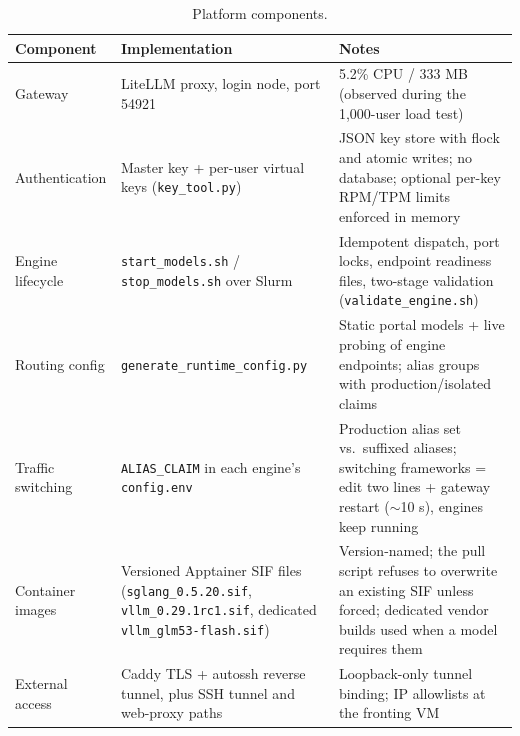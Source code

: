 \documentclass[11pt]{article}
\begin{document}
\begin{table}[t]
\centering
\small
\begin{tabularx}{\textwidth}{lXX}
\toprule
\textbf{Component} & \textbf{Implementation} & \textbf{Notes} \\
\midrule
Gateway & LiteLLM proxy, login node, port 54921 & 5.2\% CPU / 333 MB (observed during the 1,000-user load test) \\
Authentication & Master key + per-user virtual keys (\texttt{key\_tool.py}) & JSON key store with flock and atomic writes; no database; optional per-key RPM/TPM limits enforced in memory \\
Engine lifecycle & \texttt{start\_models.sh} / \texttt{stop\_models.sh} over Slurm & Idempotent dispatch, port locks, endpoint readiness files, two-stage validation (\texttt{validate\_engine.sh}) \\
Routing config & \texttt{generate\_runtime\_config.py} & Static portal models + live probing of engine endpoints; alias groups with production/isolated claims \\
Traffic switching & \texttt{ALIAS\_CLAIM} in each engine's \texttt{config.env} & Production alias set vs.\ suffixed aliases; switching frameworks = edit two lines + gateway restart ($\sim$10 s), engines keep running \\
Container images & Versioned Apptainer SIF files (\texttt{sglang\_0.5.20.sif}, \texttt{vllm\_0.29.1rc1.sif}, dedicated \texttt{vllm\_glm53-flash.sif}) & Version-named; the pull script refuses to overwrite an existing SIF unless forced; dedicated vendor builds used when a model requires them \\
External access & Caddy TLS + autossh reverse tunnel, plus SSH tunnel and web-proxy paths & Loopback-only tunnel binding; IP allowlists at the fronting VM \\
\bottomrule
\end{tabularx}
\caption{Platform components.}
\label{tab:components}
\end{table}
\end{document}
